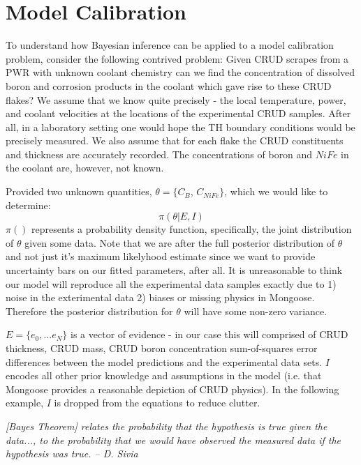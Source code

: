 \documentclass[10pt,a4paper]{report}
\begin{document}
\chapter{Model Calibration}

To understand how Bayesian inference can be applied to a model calibration problem, consider the following contrived problem:  Given CRUD scrapes from a PWR with unknown coolant chemistry can we find the concentration of dissolved boron and corrosion products in the coolant which gave rise to these CRUD flakes?  We assume that we know quite precisely - the local temperature, power, and coolant velocities at the locations of the experimental CRUD samples. After all, in a laboratory setting one would hope the TH boundary conditions would be precisely measured.  We also assume that for each flake the CRUD constituents and thickness are accurately recorded.  The concentrations of boron and $NiFe$ in the coolant are, however, not known.

Provided two unknown quantities, $\theta = \{C_{B}$, $C_{NiFe}\}$, which we would like to determine:
\begin{equation}
\pi(\theta| E, I)
\label{eq:target}
\end{equation}
$\pi()$ represents a probability density function, specifically, the joint distribution of $\theta$  given some data.  Note that we are after the full posterior distribution of $\theta$ and not just it's maximum likelyhood estimate since we want to provide uncertainty bars on our fitted parameters, after all.  It is unreasonable to think our model will reproduce all the experimental data samples exactly due to 1) noise in the exterimental data 2) biases or missing physics in Mongoose.  Therefore the posterior distribution for $\theta$ will have some non-zero variance.

$E=\{e_0, ... e_N\}$ is a vector of evidence - in our case this will comprised of CRUD thickness, CRUD mass, CRUD boron concentration sum-of-squares error differences between the model predictions and the experimental data sets. $I$ encodes all other prior knowledge and assumptions in the model (i.e. that Mongoose provides a reasonable depiction of CRUD physics).  In the following example, $I$ is dropped from the equations to reduce clutter.

\emph{[Bayes Theorem] relates the probability that the hypothesis is true given the data..., to the probability that we would have observed the measured data if the hypothesis was true. -- D. Sivia}
\end{document}
